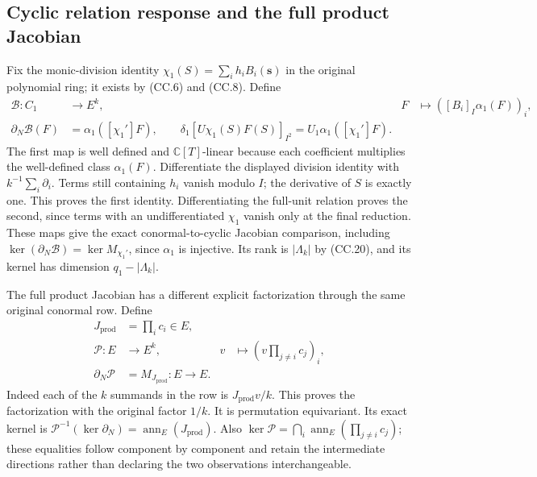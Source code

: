 \subsection{Cyclic relation response and the full product Jacobian}

Fix the monic-division identity
\(\chi_1(S)=\sum_i h_i B_i(\mathbf s)\) in the original polynomial
ring; it exists by (CC.6) and (CC.8).  Define
\[
 \begin{aligned}
 \mathcal B:C_1&\longrightarrow E^k,&
 F&\longmapsto([B_i]_{I}\alpha_1(F))_i,\\
 \partial_N\mathcal B(F)&=\alpha_1([\chi_1']F),\qquad
 \delta_1[U\chi_1(S)F(S)]_{I^2}
    =U_1\alpha_1([\chi_1']F).
 \end{aligned}\tag{CC.37}
\]
The first map is well defined and \(\mathbb C[T]\)-linear because
each coefficient multiplies the well-defined class \(\alpha_1(F)\).
Differentiate the displayed division identity with
\(k^{-1}\sum_i\partial_i\).  Terms still containing \(h_i\)
vanish modulo \(I\); the derivative of \(S\) is exactly one.
This proves the first identity.  Differentiating the full-unit
relation proves the second, since terms with an undifferentiated
\(\chi_1\) vanish only at the final reduction.  These maps give
the exact conormal-to-cyclic Jacobian comparison, including
\(\ker(\partial_N\mathcal B)=\ker M_{\chi_1'}\), since
\(\alpha_1\) is injective.  Its rank is \(|\Lambda_k|\) by
(CC.20), and its kernel has dimension \(q_1-|\Lambda_k|\).

The full product Jacobian has a different explicit factorization
through the same original conormal row.  Define
\[
 \begin{aligned}
 J_{\mathrm{prod}}&=\prod_i c_i\in E,\\
 \mathcal P:E&\longrightarrow E^k,&
 v&\longmapsto\left(v\prod_{j\ne i}c_j\right)_i,\\
 \partial_N\mathcal P&=M_{J_{\mathrm{prod}}}:E\to E.
 \end{aligned}\tag{CC.38}
\]
Indeed each of the \(k\) summands in the row is
\(J_{\mathrm{prod}}v/k\).  This proves the factorization with
the original factor \(1/k\).  It is permutation equivariant.
Its exact kernel is
\(\mathcal P^{-1}(\ker\partial_N)=\operatorname{ann}_E(J_{\mathrm{prod}})\).
Also \(\ker\mathcal P=\bigcap_i\operatorname{ann}_E(\prod_{j\ne i}c_j)\);
these equalities follow component by component and retain the
intermediate directions rather than declaring the two observations
interchangeable.

